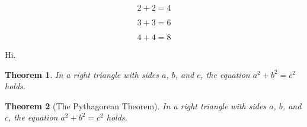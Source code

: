 \documentclass{article}
\newtheorem{theorem}{Theorem}
\begin{document}
\setcounter{equation}{12} \setcounter{page}{85}

\begin{equation}
2+2=4
\end{equation}


\begin{equation}
3+3=6
\end{equation}

\addtocounter{equation}{7}

\begin{equation}
4+4=8
\end{equation}

\newpage

\addtocounter{page}{100}

Hi.

\begin{theorem}
In a right triangle with sides $a$, $b$,
and $c$, the equation $a^2+b^2=c^2$ holds.
\end{theorem}
\begin{theorem}[The Pythagorean Theorem]
In a right triangle with sides $a$, $b$,
and $c$, the equation $a^2+b^2=c^2$ holds.
\end{theorem}
\end{document}
